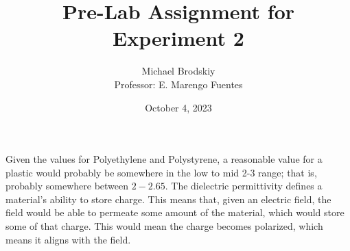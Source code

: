 


\title{Pre-Lab Assignment for Experiment 2}
\date{October 4, 2023}
\author{Michael Brodskiy\\ \small Professor: E. Marengo Fuentes}



\maketitle

Given the values for Polyethylene and Polystyrene, a reasonable value for a plastic would probably be somewhere in the low to mid 2-3 range; that is, probably somewhere between $2-2.65$. The dielectric permittivity defines a material's ability to store charge. This means that, given an electric field, the field would be able to permeate some amount of the material, which would store some of that charge. This would mean the charge becomes polarized, which means it aligns with the field.



